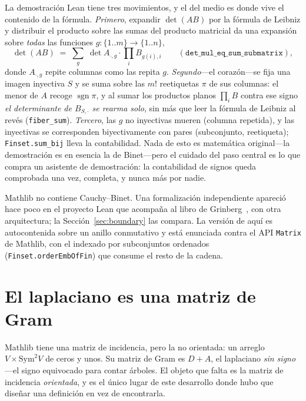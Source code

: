 \documentclass[11pt]{article}
\newcommand{\lean}[1]{\texttt{#1}}
\begin{document}
La demostraci\'on Lean tiene tres movimientos, y el del medio es donde vive el contenido de la
f\'ormula. \emph{Primero}, expandir $\det(AB)$ por la f\'ormula de Leibniz y distribuir el
producto sobre las sumas del producto matricial da una expansi\'on sobre \emph{todas} las
funciones $g:\{1..m\}\to\{1..n\}$,
\[
  \det(AB)\;=\;\sum_{g}\;\det A_{\cdot,g}\cdot\prod_{i}B_{g(i),i}
  \qquad(\lean{det\_mul\_eq\_sum\_submatrix}),
\]
donde $A_{\cdot,g}$ repite columnas como las repita $g$. \emph{Segundo}---el coraz\'on---se fija
una imagen inyectiva $S$ y se suma sobre las $m!$ reetiquetas $\pi$ de sus columnas: el menor de
$A$ recoge $\operatorname{sgn}\pi$, y al sumar los productos planos $\prod_i B$ contra ese signo
\emph{el determinante de $B_{S,\cdot}$ se rearma solo}, sin m\'as que leer la f\'ormula de
Leibniz al rev\'es (\lean{fiber\_sum}). \emph{Tercero}, las $g$ no inyectivas mueren (columna
repetida), y las inyectivas se corresponden biyectivamente con pares (subconjunto, reetiqueta);
\lean{Finset.sum\_bij} lleva la contabilidad. Nada de esto es matem\'atica original---la
demostraci\'on es en esencia la de Binet---pero el cuidado del paso central es lo que compra un
asistente de demostraci\'on: la contabilidad de signos queda comprobada una vez, completa, y
nunca m\'as por nadie.

Mathlib no contiene Cauchy--Binet. Una formalizaci\'on independiente apareci\'o hace poco en el
proyecto Lean que acompa\~na al libro de Grinberg~\cite{Grinberg,FaabianRepo}, con otra
arquitectura; la Secci\'on~\ref{sec:boundary} las compara. La versi\'on de aqu\'i es
autocontenida sobre un anillo conmutativo y est\'a enunciada contra el API \lean{Matrix} de
Mathlib, con el indexado por subconjuntos ordenados (\lean{Finset.orderEmbOfFin}) que consume
el resto de la cadena.

\section{El laplaciano es una matriz de Gram}
\label{sec:gram}

Mathlib tiene una matriz de incidencia, pero la no orientada: un arreglo
$V\times\mathrm{Sym}^2V$ de ceros y unos. Su matriz de Gram es $D+A$, el laplaciano \emph{sin
signo}---el signo equivocado para contar \'arboles. El objeto que falta es la matriz de
incidencia \emph{orientada}, y es el \'unico lugar de este desarrollo donde hubo que
dise\~nar una definici\'on en vez de encontrarla.
\end{document}
